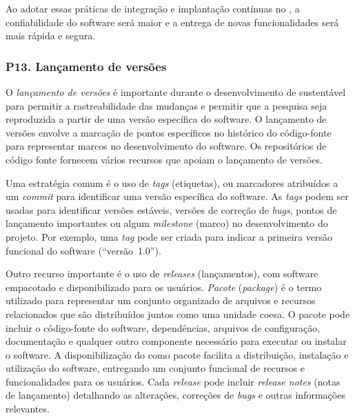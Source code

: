Ao adotar essas práticas de integração e implantação contínuas no \RS, a confiabilidade do software será maior e a entrega de novas funcionalidades será mais rápida e segura.



\subsubsection*{P13. Lançamento de versões} 

O \textit{lançamento de versões} é importante durante o desenvolvimento de \RSw sustentável para permitir a rastreabilidade das mudanças e permitir que a pesquisa seja reproduzida a partir de uma versão específica do software. O lançamento de versões envolve a marcação de pontos específicos no histórico do código-fonte para representar marcos no desenvolvimento do software. Os repositórios de código fonte fornecem vários recursos que apoiam o lançamento de versões.

Uma estratégia comum é o uso de \textit{tags} (etiquetas), ou marcadores atribuídos a um \textit{commit} para identificar uma versão específica do software. 
As \textit{tags} podem ser usadas para identificar versões estáveis, versões de correção de \textit{bugs}, pontos de lançamento importantes ou algum \textit{milestone} (marco) no desenvolvimento do projeto. Por exemplo, uma \textit{tag} pode ser criada para indicar a primeira versão funcional do software (``versão~1.0'').

Outro recurso importante é o uso de \textit{releases} (lançamentos), com software empacotado e disponibilizado para os usuários. 
\textit{Pacote} (\textit{package}) é o termo utilizado para representar um conjunto organizado de arquivos e recursos relacionados que são distribuídos juntos como uma unidade coesa. O pacote pode incluir o código-fonte do software, dependências, arquivos de configuração, documentação e qualquer outro componente necessário para executar ou instalar o software. A disponibilização do \RSw como pacote facilita a distribuição, instalação e utilização do software, entregando um conjunto funcional de recursos e funcionalidades para os usuários. Cada \textit{release}  pode incluir \textit{release notes} (notas de lançamento) detalhando as alterações, correções de \textit{bugs} e outras informações relevantes.

